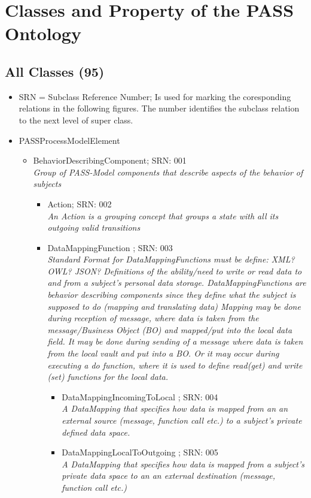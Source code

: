 \chapter{Classes and Property of the PASS Ontology}


\section{All Classes (95)}

\begin{itemize}
\item SRN = Subclass Reference Number; Is used for marking the coresponding relations in the following figures. The number identifies the subclass relation to the next level of super class.
\item PASSProcessModelElement
\begin{itemize}
	\item BehaviorDescribingComponent; SRN: 001 \\  \textit{Group of PASS-Model components that describe aspects of the behavior of subjects}
	\begin{itemize}
		\item Action; SRN: 002 \\ \textit{An Action is a grouping concept that groups a state with all its outgoing valid transitions}
		\item DataMappingFunction ; SRN: 003 \\ \textit{Standard Format for DataMappingFunctions must be define: XML? OWL? JSON? 
		Definitions of the ability/need to write or read data to and from a subject's personal data storage.
		DataMappingFunctions are behavior describing components since they define what the subject is supposed to do (mapping and translating data)
		Mapping may be done during reception of message, where data is taken from the message/Business Object (BO) and mapped/put into the local data field.
		It may be done during sending of a message where data is taken from the local vault and put into a BO.
		Or it may occur during executing a do function, where it is used to define read(get) and write (set) functions for the local data.}
		\begin{itemize}
			\item DataMappingIncomingToLocal ; SRN: 004 \\ \textit{A DataMapping that specifies how data is mapped from an an external source (message, function call etc.) to a subject's private defined data space.}
			\item DataMappingLocalToOutgoing ; SRN: 005 \\ \textit{A DataMapping that specifies how data is mapped from a subject's private data space to an an external destination (message, function call etc.)}

\end{itemize}
\end{itemize}
\end{itemize}
\end{itemize}
